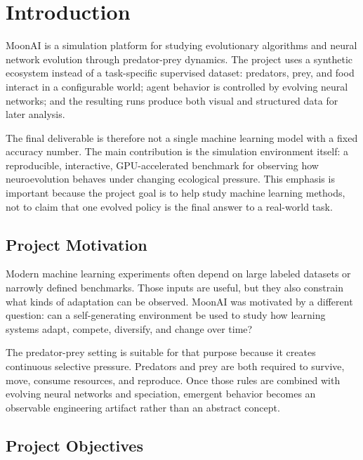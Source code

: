 \section{Introduction}
\label{sec:intro}

MoonAI is a simulation platform for studying evolutionary algorithms and neural network
evolution through predator-prey dynamics. The project uses a synthetic ecosystem instead of a
task-specific supervised dataset: predators, prey, and food interact in a configurable world;
agent behavior is controlled by evolving neural networks; and the resulting runs produce both
visual and structured data for later analysis.

The final deliverable is therefore not a single machine learning model with a fixed accuracy
number. The main contribution is the simulation environment itself: a reproducible,
interactive, GPU-accelerated benchmark for observing how neuroevolution behaves under
changing ecological pressure. This emphasis is important because the project goal is to help
study machine learning methods, not to claim that one evolved policy is the final answer to a
real-world task.

\subsection{Project Motivation}

Modern machine learning experiments often depend on large labeled datasets or narrowly defined
benchmarks. Those inputs are useful, but they also constrain what kinds of adaptation can be
observed. MoonAI was motivated by a different question: can a self-generating environment be
used to study how learning systems adapt, compete, diversify, and change over time?

The predator-prey setting is suitable for that purpose because it creates continuous selective
pressure. Predators and prey are both required to survive, move, consume resources, and
reproduce. Once those rules are combined with evolving neural networks and speciation,
emergent behavior becomes an observable engineering artifact rather than an abstract concept.

\subsection{Project Objectives}

